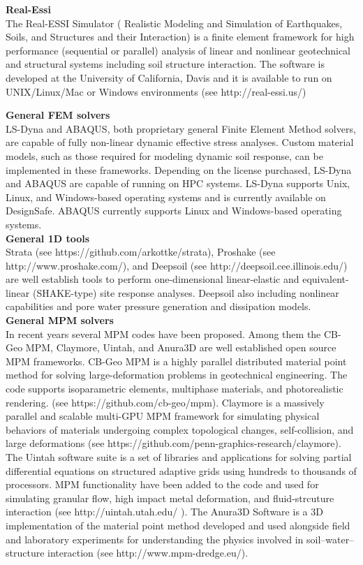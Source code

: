 \noindent\textbf{Real-Essi}\\ The Real-ESSI Simulator ( Realistic Modeling and Simulation of Earthquakes, Soils, and Structures and their Interaction) is a finite element framework for high performance (sequential or parallel) analysis of linear and nonlinear geotechnical and structural systems including soil structure interaction. The software is developed at the University of California, Davis and it is available to run on UNIX/Linux/Mac or Windows environments (see http://real-essi.us/)
\newline 

\noindent\textbf{General FEM solvers}\\
LS-Dyna and ABAQUS, both proprietary general Finite Element Method solvers, are capable of fully non-linear dynamic effective stress analyses. Custom material models, such as those required for modeling dynamic soil response, can be implemented in these frameworks. Depending on the license purchased, LS-Dyna and ABAQUS are capable of running on HPC systems. LS-Dyna supports Unix, Linux, and Windows-based operating systems and is currently available on DesignSafe. ABAQUS currently supports Linux and Windows-based operating systems.\\

\noindent\textbf{General 1D tools}\\
Strata (see https://github.com/arkottke/strata), Proshake (see http://www.proshake.com/), and Deepsoil (see http://deepsoil.cee.illinois.edu/) are well establish tools to perform one-dimensional linear-elastic and equivalent-linear (SHAKE-type) site response analyses. Deepsoil also including nonlinear capabilities and pore water pressure generation and dissipation models.\\

\noindent\textbf{General MPM solvers}\\
In recent years several MPM codes have been proposed. Among them the CB-Geo MPM, Claymore, Uintah, and Anura3D are well established open source MPM frameworks. CB-Geo MPM is a highly parallel distributed material point method for solving large-deformation problems in geotechnical engineering. The code supports isoparametric elements, multiphase materials, and photorealistic rendering.
(see https://github.com/cb-geo/mpm). Claymore is a massively parallel and scalable multi-GPU MPM framework for simulating physical behaviors of materials undergoing complex topological changes, self-collision, and large deformations (see https://github.com/penn-graphics-research/claymore). The Uintah software suite is a set of libraries and applications for solving partial differential equations on structured adaptive grids using hundreds to thousands of processors. MPM functionality have been added to the code and used for simulating granular flow, high impact metal deformation, and fluid-strcuture interaction (see http://uintah.utah.edu/ ). The Anura3D Software is a 3D implementation of the material point method developed and used alongside field and laboratory experiments for understanding the physics involved in soil–water–structure interaction (see http://www.mpm-dredge.eu/).\\

